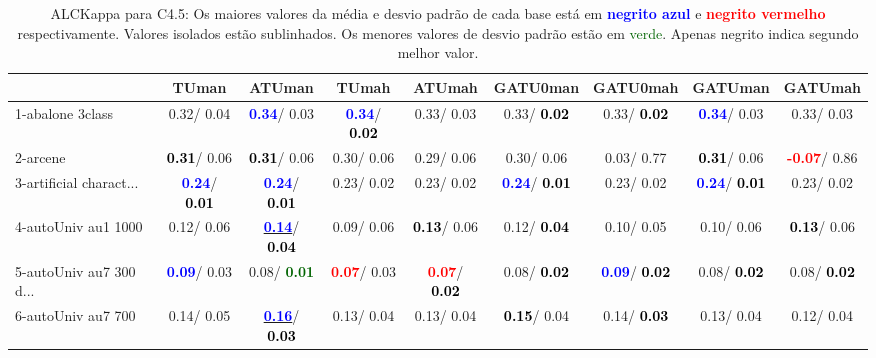 \begin{table}[h]
\caption{ALCKappa para C4.5: Os maiores valores da média e desvio padrão de cada base está em \textcolor{blue}{\textbf{negrito azul}} e \textcolor{red}{\textbf{negrito vermelho}} respectivamente. Valores isolados estão sublinhados. Os menores valores de desvio padrão estão em \textcolor{darkgreen}{verde}. Apenas negrito indica segundo melhor valor.}
\begin{center}\begin{tabular}{lc|c|c|c|c|c|c|c}
 & TUman & \textbf{ATUman} & TUmah & \textbf{ATUmah} & GATU0man & GATU0mah & GATUman & GATUmah\\ \hline 1-abalone 3class &   0.32/  0.04 & \textcolor{blue}{\textbf{  0.34}}/  0.03 & \textcolor{blue}{\textbf{  0.34}}/\textcolor{black}{\textbf{  0.02}} &   0.33/  0.03 &   0.33/\textcolor{black}{\textbf{  0.02}} &   0.33/\textcolor{black}{\textbf{  0.02}} & \textcolor{blue}{\textbf{  0.34}}/  0.03 &   0.33/  0.03 \\
2-arcene & \textcolor{black}{\textbf{  0.31}}/  0.06 & \textcolor{black}{\textbf{  0.31}}/  0.06 &   0.30/  0.06 &   0.29/  0.06 &   0.30/  0.06 &   0.03/  0.77 & \textcolor{black}{\textbf{  0.31}}/  0.06 & \textcolor{red}{\textbf{ -0.07}}/  0.86 \\
3-artificial charact... & \textcolor{blue}{\textbf{  0.24}}/\textcolor{black}{\textbf{  0.01}} & \textcolor{blue}{\textbf{  0.24}}/\textcolor{black}{\textbf{  0.01}} &   0.23/  0.02 &   0.23/  0.02 & \textcolor{blue}{\textbf{  0.24}}/\textcolor{black}{\textbf{  0.01}} &   0.23/  0.02 & \textcolor{blue}{\textbf{  0.24}}/\textcolor{black}{\textbf{  0.01}} &   0.23/  0.02 \\
4-autoUniv au1 1000 &   0.12/  0.06 & \underline{\textcolor{blue}{\textbf{  0.14}}}/\textcolor{black}{\textbf{  0.04}} &   0.09/  0.06 & \textcolor{black}{\textbf{  0.13}}/  0.06 &   0.12/\textcolor{black}{\textbf{  0.04}} &   0.10/  0.05 &   0.10/  0.06 & \textcolor{black}{\textbf{  0.13}}/  0.06 \\
5-autoUniv au7 300 d... & \textcolor{blue}{\textbf{  0.09}}/  0.03 &   0.08/\textcolor{darkgreen}{\textbf{  0.01}} & \textcolor{red}{\textbf{  0.07}}/  0.03 & \textcolor{red}{\textbf{  0.07}}/\textcolor{black}{\textbf{  0.02}} &   0.08/\textcolor{black}{\textbf{  0.02}} & \textcolor{blue}{\textbf{  0.09}}/\textcolor{black}{\textbf{  0.02}} &   0.08/\textcolor{black}{\textbf{  0.02}} &   0.08/\textcolor{black}{\textbf{  0.02}} \\
6-autoUniv au7 700 &   0.14/  0.05 & \underline{\textcolor{blue}{\textbf{  0.16}}}/\textcolor{black}{\textbf{  0.03}} &   0.13/  0.04 &   0.13/  0.04 & \textcolor{black}{\textbf{  0.15}}/  0.04 &   0.14/\textcolor{black}{\textbf{  0.03}} &   0.13/  0.04 &   0.12/  0.04 \\

\end{tabular}
\end{center}
\end{table}
